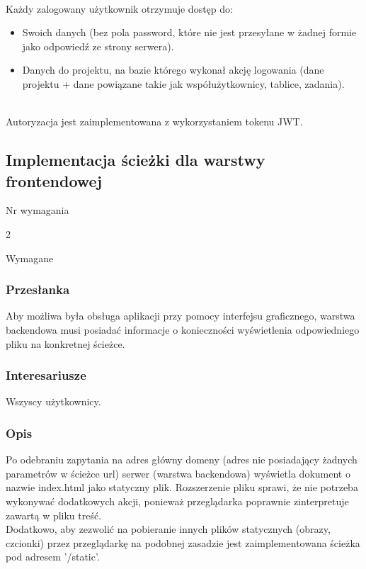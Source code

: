 \documentclass[eng,printmode]{mgr}
\begin{document}
\ \\
Każdy zalogowany użytkownik otrzymuje dostęp do:
\begin{itemize}
  \item[--] Swoich danych (bez pola password, które nie jest przesyłane w żadnej formie jako odpowiedź ze strony serwera).
  \item[--] Danych do projektu, na bazie którego wykonał akcję logowania (dane projektu + dane powiązane takie jak współużytkownicy, tablice, zadania).
\end{itemize}
\ \\
Autoryzacja jest zaimplementowana z wykorzystaniem tokenu JWT\cite{Keyword_JWTToken}.

\subsection{Implementacja ścieżki dla warstwy frontendowej}
\begin{labeling}{Nr wymagania}
\item [Nr wymagania:] 2
\item [Priorytet:] Wymagane
\end{labeling}

\subsubsection{Przesłanka}
Aby możliwa była obsługa aplikacji przy pomocy interfejsu graficznego, warstwa backendowa musi posiadać informacje o konieczności wyświetlenia odpowiedniego pliku na konkretnej ścieżce.


\subsubsection{Interesariusze}
Wszyscy użytkownicy.

\subsubsection{Opis}
Po odebraniu zapytania na adres główny domeny (adres nie posiadający żadnych parametrów w ścieżce url) serwer (warstwa backendowa) wyświetla dokument o nazwie index.html jako statyczny plik. Rozszerzenie pliku sprawi, że nie potrzeba wykonywać dodatkowych akcji, ponieważ przeglądarka poprawnie zinterpretuje zawartą w pliku treść. \\
Dodatkowo, aby zezwolić na pobieranie innych plików statycznych (obrazy, czcionki) przez przeglądarkę na podobnej zasadzie jest zaimplementowana ścieżka pod adresem '/static'.
\end{document}
